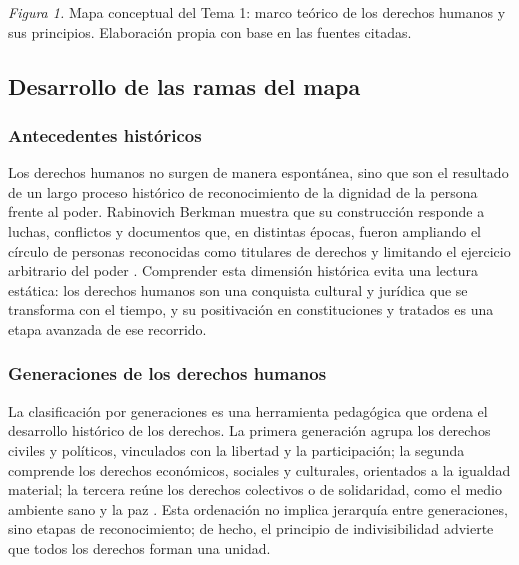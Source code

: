 ﻿\documentclass[
  spanish,
  letterpaper, oneside
]{article}
\begin{document}
\begin{landscape}
\begin{center}
{\begin{tikzpicture}[node distance=0.55cm and 0.9cm]
\end{tikzpicture}}

\vspace{0.12cm}
{\footnotesize \textit{Figura 1.} Mapa conceptual del Tema 1: marco teórico de los derechos humanos y sus principios. Elaboración propia con base en las fuentes citadas.}
\end{center}
\end{landscape}

\subsection{Desarrollo de las ramas del mapa}

\subsubsection{Antecedentes históricos}

Los derechos humanos no surgen de manera espontánea, sino que son el resultado de un largo proceso histórico de reconocimiento de la dignidad de la persona frente al poder. Rabinovich Berkman muestra que su construcción responde a luchas, conflictos y documentos que, en distintas épocas, fueron ampliando el círculo de personas reconocidas como titulares de derechos y limitando el ejercicio arbitrario del poder \citep{rabinovichBerkmanDerechosHumanos}. Comprender esta dimensión histórica evita una lectura estática: los derechos humanos son una conquista cultural y jurídica que se transforma con el tiempo, y su positivación en constituciones y tratados es una etapa avanzada de ese recorrido.

\subsubsection{Generaciones de los derechos humanos}

La clasificación por generaciones es una herramienta pedagógica que ordena el desarrollo histórico de los derechos. La primera generación agrupa los derechos civiles y políticos, vinculados con la libertad y la participación; la segunda comprende los derechos económicos, sociales y culturales, orientados a la igualdad material; la tercera reúne los derechos colectivos o de solidaridad, como el medio ambiente sano y la paz \citep{marcanoSalazarDerechosHumanos}. Esta ordenación no implica jerarquía entre generaciones, sino etapas de reconocimiento; de hecho, el principio de indivisibilidad advierte que todos los derechos forman una unidad.
\end{document}
